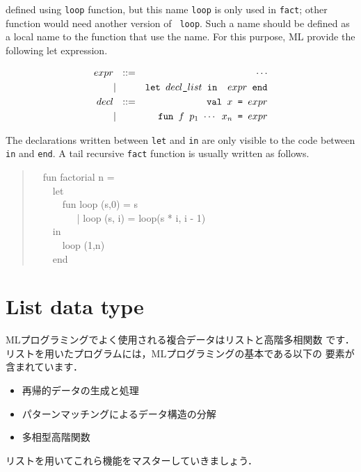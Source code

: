 \documentclass{jbook}
\newcommand{\txt}[2]{#2}
\newcommand{\myem}{\mbox{\ \ }}
\newcommand{\myfm}{\mbox{ \ \ }}
\begin{document}
defined using {\tt loop} function, but this name {\tt loop} is only
used in {\tt fact}; other function would need another version of {\tt
loop}.
	Such a name should be defined as a local name to the function
that use the name.
	For this purpose, ML provide the following let expression.
\begin{tt}
\begin{eqnarray*}
expr &\mbox{\ \ }::=& \cdots \\
     &|& \mbox{\tt let\ $decl\_list$\ in \ $expr$\ end}
\\
decl &\mbox{\ \ }::=& \mbox{\tt val\ $x$ = $expr$}
\\
     &|& \mbox{\tt fun\ $f$\ $p_1$ $\cdots$ $x_n$ =  $expr$}
\end{eqnarray*}
\end{tt}
	The declarations written between 
{\tt let} and {\tt in} are only visible to the code between {\tt in} and
{\tt end}.
	A tail recursive {\tt fact} function is usually written as follows.
\begin{tt}
\begin{quote}
\myem  fun factorial n =
\\\myem\myem    let
\\\myem\myem\myem      fun loop (s,0) = s
\\\myem\myem\myem\myfm        | loop (s, i) = loop(s * i, i - 1)
\\\myem\myem    in
\\\myem\myem\myem      loop (1,n)
\\\myem\myem    end
\end{quote}
\end{tt}
\fi%

\section{\txt{リストデータ型}{List data type}}
\label{sec:tutorialList}

\ifjp%
	MLプログラミングでよく使用される複合データはリストと高階多相関数
です．
	リストを用いたプログラムには，MLプログラミングの基本である以下の
要素が含まれています．
\begin{itemize}
\item 
再帰的データの生成と処理
\item 
パターンマッチングによるデータ構造の分解
\item 
多相型高階関数
\end{itemize}
	リストを用いてこれら機能をマスターしていきましょう．
\end{document}
